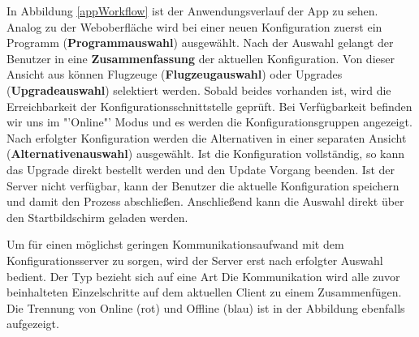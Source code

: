 In Abbildung \ref{appWorkflow} ist der Anwendungsverlauf der App zu sehen. Analog zu der Weboberfläche wird bei einer neuen Konfiguration zuerst ein Programm (\textbf{Programmauswahl}) ausgewählt. Nach der Auswahl gelangt der Benutzer in eine \textbf{Zusammenfassung} der aktuellen Konfiguration. Von dieser Ansicht aus können Flugzeuge (\textbf{Flugzeugauswahl}) oder  Upgrades (\textbf{Upgradeauswahl}) selektiert werden. Sobald beides vorhanden ist, wird die Erreichbarkeit der Konfigurationsschnittstelle geprüft. Bei Verfügbarkeit befinden wir uns im "'Online"' Modus und es werden die Konfigurationsgruppen angezeigt. Nach erfolgter Konfiguration werden die Alternativen in einer separaten Ansicht (\textbf{Alternativenauswahl}) ausgewählt. Ist die Konfiguration vollständig, so kann das Upgrade direkt bestellt werden und den Update Vorgang beenden. Ist der Server nicht verfügbar, kann der Benutzer die aktuelle Konfiguration speichern und damit den Prozess abschließen. Anschließend kann die Auswahl direkt über den Startbildschirm geladen werden. \par

Um für einen möglichst geringen Kommunikationsaufwand mit dem Konfigurationsserver zu sorgen, wird der Server erst nach erfolgter Auswahl bedient. Der Typ bezieht sich auf eine Art Die Kommunikation wird alle zuvor beinhalteten Einzelschritte auf dem aktuellen Client zu einem Zusammenfügen. Die Trennung von Online (rot) und Offline (blau)  ist in der Abbildung ebenfalls aufgezeigt. 

